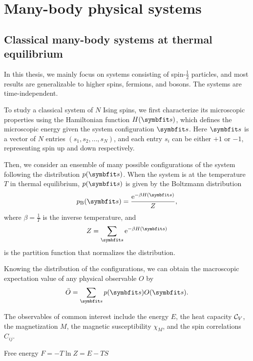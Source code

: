 \chapter{Many-body physical systems}


\section{Classical many-body systems at thermal equilibrium}
\label{sec:cl-sys}

In this thesis, we mainly focus on systems consisting of spin-$\frac{1}{2}$ particles, and most results are generalizable to higher spins, fermions, and bosons. The systems are time-independent.

To study a classical system of $N$ Ising spins, we first characterize its microscopic properties using the Hamiltonian function $H(\vs)$, which defines the microscopic energy given the system configuration $\vs$. Here $\vs$ is a vector of $N$ entries $(s_1, s_2, \ldots, s_N)$, and each entry $s_i$ can be either $+1$ or $-1$, representing spin up and down respectively.

Then, we consider an ensemble of many possible configurations of the system following the distribution $p(\vs)$. When the system is at the temperature $T$ in thermal equilibrium, $p(\vs)$ is given by the Boltzmann distribution
\begin{equation}
p_\text{B}(\vs) = \frac{\rme^{-\beta H(\vs)}}{Z},
\label{eq:boltzmann}
\end{equation}
where $\beta = \frac{1}{T}$ is the inverse temperature, and
\begin{equation}
Z = \sum_\vs \rme^{-\beta H(\vs)}
\end{equation}
is the partition function that normalizes the distribution.

Knowing the distribution of the configurations, we can obtain the macroscopic expectation value of any physical observable $O$ by
\begin{equation}
\bar{O} = \sum_\vs p(\vs) O(\vs).
\label{eq:cl-obs}
\end{equation}

The observables of common interest include the energy $E$, the heat capacity $\mathcal{C}_V$, the magnetization $M$, the magnetic susceptibility $\chi_M$, and the spin correlations $C_{i j}$.

Free energy $F = -T \ln Z = E - T S$


